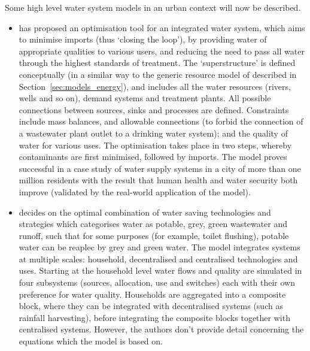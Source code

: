 Some high level water system models in an urban context will now be described. 
\begin{itemize}
	\item \citet{Lim2010} has proposed an optimisation tool for an integrated water system, which aims to minimise imports (thus `closing the loop'), by providing water of appropriate qualities to various users, and reducing the need to pass all water through the highest standards of treatment. The `superstructure' is defined conceptually (in a similar way to the generic resource model of \citet{Samsatli} described in Section~\ref{sec:models_energy}), and includes all the water resources (rivers, wells and so on), demand systems and treatment plants. All possible connections between sources, sinks and processes are defined. Constraints include mass balances, and allowable connections (to forbid the connection of a wastewater plant outlet to a drinking water system); and the quality of water for various uses. The optimisation takes place in two steps, whereby contaminants are first minimised, followed by imports. The model proves successful in a case study of water supply systems in a city of more than one million residents with the result that human health and water security both improve (validated by the real-world application of the model).
	\item \citet{Makropoulos2008} decides on the optimal combination of water saving technologies and strategies which categorises water as potable, grey, green wastewater and runoff, such that for some purposes (for example, toilet flushing), potable water can be reaplec by grey and green water. The model integrates systems at multiple scales: household, decentralised and centralised technologies and uses. Starting at the household level water flows and quality are simulated in four subsystems (sources, allocation, use and switches) each with their own preference for water quality. Households are aggregated into a composite block, where they can be integrated with decentralised systems (such as rainfall harvesting), before integrating the composite blocks together with centralised systems. However, the authors don't provide detail concerning the equations which the model is based on.
\end{itemize}

